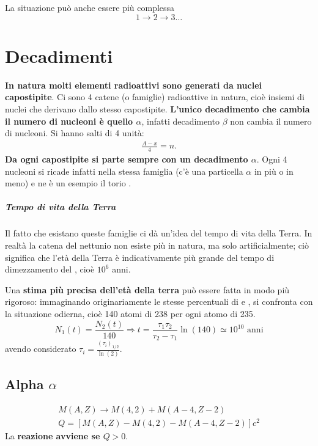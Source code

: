 \documentclass[a4paper,11pt,twoside,openany]{book}
\theoremstyle{definition}
\theoremstyle{plain}
\theoremstyle{plain}
\theoremstyle{definition}
\begin{document}
La situazione può anche essere più complessa $$1\longrightarrow 2\longrightarrow 3\dots$$

\chapter{Decadimenti} %
\textbf{In natura molti elementi radioattivi sono generati da nuclei capostipite}. Ci sono 4 catene (o famiglie) radioattive in natura, cioè insiemi di nuclei che derivano dallo stesso capostipite. \textbf{L'unico decadimento che cambia il numero di nucleoni è quello $\alpha$}, infatti decadimento $\beta$ non cambia il numero di nucleoni. Si hanno salti di 4 unità:
\begin{equation}\begin{split}
\frac{A-x}{4}=n.
\end{split}\end{equation}
\textbf{Da ogni capostipite si parte sempre con un decadimento $\alpha$}. Ogni 4 nucleoni si ricade infatti nella stessa famiglia (c'è una particella $\alpha$ in più o in meno) e ne è un esempio il torio .

\paragraph{Tempo di vita della Terra} Il fatto che esistano queste famiglie ci dà un'idea del tempo di vita della Terra. In realtà la catena del nettunio  non esiste più in natura, ma solo artificialmente; ciò significa che l'età della Terra è indicativamente più grande del tempo di dimezzamento del , cioè $10^6$ anni.

Una \textbf{stima più precisa dell'età della terra} può essere fatta in modo più rigoroso: immaginando originariamente le stesse percentuali di  e , si confronta con la situazione odierna, cioè 140 atomi di 238 per ogni atomo di 235. $$N_1\left(t\right)=\frac{N_2\left(t\right)}{140} \Longrightarrow t=\frac{\tau_1\tau_2}{\tau_2-\tau_1}\ln{\left(140\right)}\simeq 10^{10} \textrm{ anni}$$ avendo considerato $\tau_i=\frac{\left(\tau_i\right)_{1/2}}{\ln{\left(2\right)}}$.

\section{Alpha $\alpha$} %
\begin{equation}\begin{split}
M\left(A,Z\right)\longrightarrow M\left(4,2\right)+M\left(A-4,Z-2\right)\\
Q=\left[M\left(A,Z\right)-M\left(4,2\right)-M\left(A-4,Z-2\right)\right]c^2
\end{split}\end{equation}
La \textbf{reazione avviene se $Q>0$}.
\end{document}
